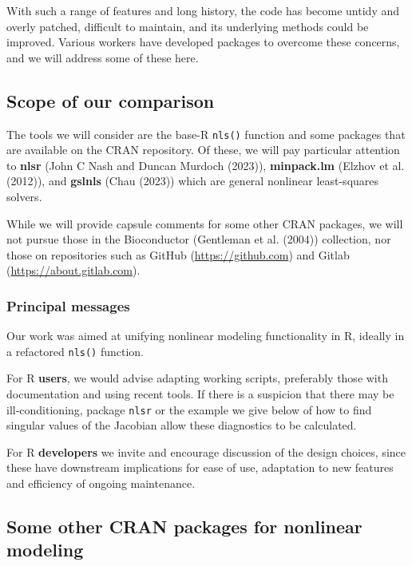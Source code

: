 With such a range of features and long history, the code has become untidy
and overly patched, difficult to maintain, and its underlying methods could
be improved. Various workers have developed packages to overcome these
concerns, and we will address some of these here.

\subsection{Scope of our comparison}\label{scope-of-our-comparison}

The tools we will consider are the base-R \texttt{nls()} function
and some packages that are available on the CRAN repository.
Of these, we will pay particular attention to \textbf{nlsr} (John C Nash and Duncan Murdoch (2023)),
\textbf{minpack.lm} (Elzhov et al. (2012)), and \textbf{gslnls} (Chau (2023)) which are
general nonlinear least-squares solvers.

While we will provide capsule comments for some other CRAN packages,
we will not pursue those in the Bioconductor (Gentleman et al. (2004))
collection, nor those on repositories such as
GitHub (\url{https://github.com}) and Gitlab (\url{https://about.gitlab.com}).

\subsubsection{Principal messages}\label{principal-messages}

Our work was aimed at unifying nonlinear modeling functionality in R,
ideally in a refactored \texttt{nls()} function.

For R \textbf{users}, we would advise adapting working scripts, preferably those
with documentation and using recent tools. If there is a suspicion that there
may be ill-conditioning, package \texttt{nlsr} or the example we give below of how to
find singular values of the Jacobian allow these diagnostics to be calculated.

For R \textbf{developers} we invite and encourage discussion of the design choices, since these
have downstream implications for ease of use, adaptation to new features and
efficiency of ongoing maintenance.

\subsection{Some other CRAN packages for nonlinear modeling}\label{some-other-cran-packages-for-nonlinear-modeling}

